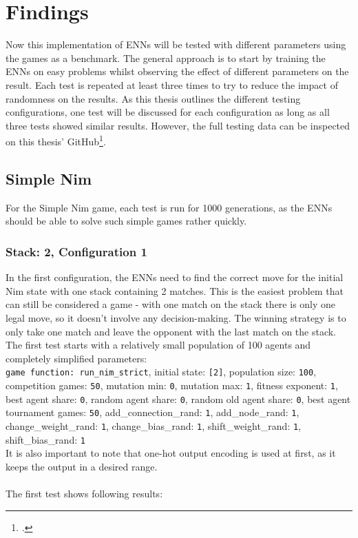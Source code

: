 \section{Findings}\label{sec:first-findings}
Now this implementation of ENNs will be tested with different parameters using the games as a benchmark.
The general approach is to start by training the ENNs on easy problems whilst observing the effect of different parameters on the result.
Each test is repeated at least three times to try to reduce the impact of randomness on the results.
As this thesis outlines the different testing configurations, one test will be discussed for each configuration as long as all three tests showed similar results.
However, the full testing data can be inspected on this thesis' GitHub\footcite{RustENN}.

\subsection{Simple Nim}\label{subsec:simple-nim-results}
For the Simple Nim game, each test is run for 1000 generations, as the ENNs should be able to solve such simple games rather quickly.

\subsubsection{Stack: 2, Configuration 1}
In the first configuration, the ENNs need to find the correct move for the initial Nim state with one stack containing 2 matches.
This is the easiest problem that can still be considered a game - with one match on the stack there is only one legal move, so it doesn't involve any decision-making.
The winning strategy is to only take one match and leave the opponent with the last match on the stack.
The first test starts with a relatively small population of 100 agents and completely simplified parameters:
\\
\texttt{game function: run\_nim\_strict}, initial state: \texttt{[2]}, population size: \texttt{100}, competition games: \texttt{50}, mutation min: \texttt{0}, mutation max: \texttt{1}, fitness exponent: \texttt{1}, best agent share:
\texttt{0}, random agent share: \texttt{0}, random old agent share: \texttt{0}, best agent tournament games: \texttt{50}, add\_connection\_rand: \texttt{1}, add\_node\_rand: \texttt{1}, change\_weight\_rand: \texttt{1}, change\_bias\_rand: \texttt{1}, shift\_weight\_rand: \texttt{1}, shift\_bias\_rand: \texttt{1}\\
It is also important to note that one-hot output encoding is used at first, as it keeps the output in a desired range.
\\ \\
The first test shows following results:
\\
\newcommand{\csvpath}{../data/simple_nim/stack_2/t_1/stats.csv} %


